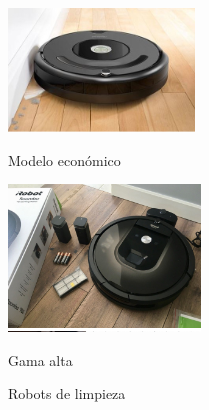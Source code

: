 \begin{figure}[ht!]
	\centering
	\begin{minipage}{0.3\linewidth}
		\centering
		\includegraphics[width=\linewidth]{figs/gama-baja.png}
		\caption*{\centering Modelo económico \cite{plaza_robotica_servicio}}
	\end{minipage}
	\hspace{3cm}
	\begin{minipage}{0.3\linewidth}
		\centering
		\includegraphics[width=\linewidth]{figs/gama-alta.png}
		\caption*{\centering Gama alta \cite{plaza_robotica_servicio}}
	\end{minipage}
	\caption{Robots de limpieza}
	\label{fig:roblimpieza}
\end{figure}


